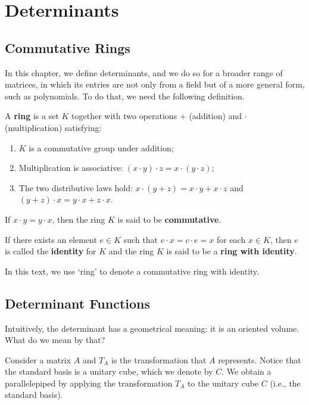\chapter{Determinants}

\section{Commutative Rings}

In this chapter, we define determinants, and we do so for a broader range of matrices, in which its entries are not only from a field but of a more general form, such as polynomials. To do that, we need the following definition.

\begin{definition}[Ring]
	A \textbf{ring}	is a set $K$ together with two operations $+$ (addition) and $\cdot$ (multiplication) satisfying:
	\begin{enumerate}
		\item $K$ is a commutative group under addition;
		\item Multiplication is associative: $(x \cdot y) \cdot z = x \cdot (y \cdot z)$;
		\item The two distributive laws hold: $x \cdot (y + z) = x \cdot y + x \cdot z$ and $(y + z) \cdot x = y\cdot x + z \cdot x$.
	\end{enumerate}
	
	If $x \cdot y = y \cdot x$, then the ring $K$ is said to be \textbf{commutative}.
	
	If there exists an element $e \in K$ such that $e \cdot x = c \cdot e = x$ for each $x \in K$, then $e$ is called the \textbf{identity} for $K$ and the ring $K$ is said to be a \textbf{ring with identity}.
\end{definition}

In this text, we use `ring' to denote a commutative ring with identity.

\section{Determinant Functions}

Intuitively, the determinant has a geometrical meaning: it is an oriented volume. What do we mean by that?

Consider a matrix $A$ and $T_A$ is the transformation that $A$ represents. Notice that the standard basis is a unitary cube, which we denote by $C$. We obtain a parallelepiped by applying the transformation $T_A$ to the unitary cube $C$ (i.e., the standard basis).

